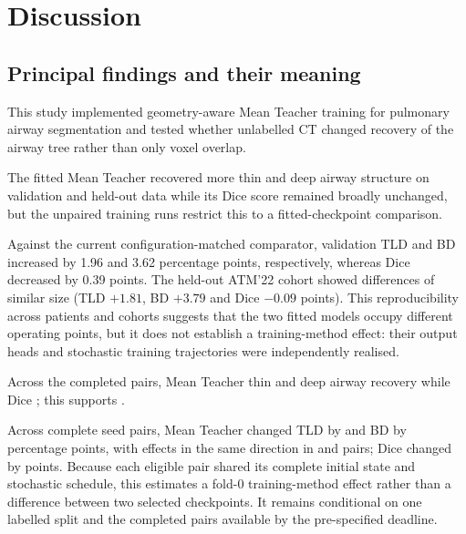 \chapter{Discussion}
\label{ch:discussion}


\section{Principal findings and their meaning}

This study implemented geometry-aware Mean Teacher training for pulmonary airway segmentation
and tested whether unlabelled CT changed recovery of the airway tree rather than only voxel
overlap.

\ifshowcurrentcontrol
\begin{currentcontrolroute}
The fitted Mean Teacher recovered more thin and deep airway structure on validation and held-out
data while its Dice score remained broadly unchanged, but the unpaired training runs restrict
this to a fitted-checkpoint comparison.

Against the current configuration-matched comparator, validation TLD and BD increased by
1.96 and 3.62 percentage points, respectively, whereas Dice decreased by 0.39 points. The
held-out ATM'22 cohort showed differences of similar size (TLD $+1.81$, BD $+3.79$ and Dice
$-0.09$ points). This reproducibility across patients and cohorts suggests that the two fitted
models occupy different operating points, but it does not establish a training-method effect:
their output heads and stochastic training trajectories were independently realised.
\end{currentcontrolroute}
\fi

\ifshowpairedcontrol
\begin{pairedcontrolroute}
Across the completed pairs, Mean Teacher 
thin and deep airway recovery while Dice ; this supports
.

Across \pending[: number] complete seed pairs, Mean Teacher changed TLD by \pending and BD by
\pending percentage points, with effects in the same direction in \pending and \pending pairs;
Dice changed by \pending points. Because each eligible pair shared its complete initial state and
stochastic schedule, this estimates a fold-0 training-method effect rather than a difference
between two selected checkpoints. It remains conditional on one labelled split and the completed
pairs available by the pre-specified deadline.
\end{pairedcontrolroute}
\fi

